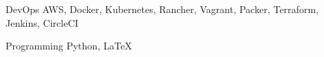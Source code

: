 

\begin{cvskills}

  \cvskill
    {DevOps} %
    {AWS, Docker, Kubernetes, Rancher, Vagrant, Packer, Terraform, Jenkins, CircleCI} %

  \cvskill
    {Programming} %
    {Python, LaTeX} %

\end{cvskills}
